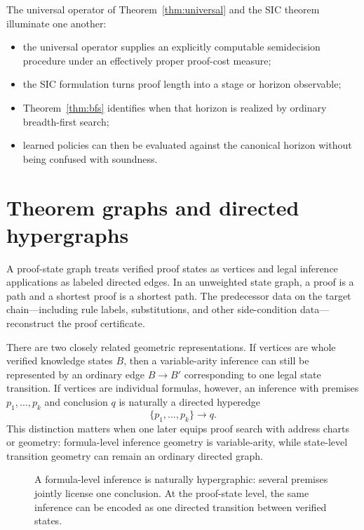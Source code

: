 \documentclass[11pt,oneside]{book}
\theoremstyle{definition}
\theoremstyle{remark}
\begin{document}
The universal operator of Theorem~\ref{thm:universal} and the SIC theorem illuminate one another:
\begin{itemize}
\item the universal operator supplies an explicitly computable semidecision procedure under an effectively proper proof-cost measure;
\item the SIC formulation turns proof length into a stage or horizon observable;
\item Theorem~\ref{thm:bfs} identifies when that horizon is realized by ordinary breadth-first search;
\item learned policies can then be evaluated against the canonical horizon without being confused with soundness.
\end{itemize}

\section{Theorem graphs and directed hypergraphs}
A proof-state graph treats verified proof states as vertices and legal inference applications as labeled directed edges. In an unweighted state graph, a proof is a path and a shortest proof is a shortest path. The predecessor data on the target chain---including rule labels, substitutions, and other side-condition data---reconstruct the proof certificate.

There are two closely related geometric representations. If vertices are whole verified knowledge states $B$, then a variable-arity inference can still be represented by an ordinary edge $B\to B'$ corresponding to one legal state transition. If vertices are individual formulas, however, an inference with premises $p_1,\ldots,p_k$ and conclusion $q$ is naturally a directed hyperedge
\[
\{p_1,\ldots,p_k\}\longrightarrow q.
\]
This distinction matters when one later equips proof search with address charts or geometry: formula-level inference geometry is variable-arity, while state-level transition geometry can remain an ordinary directed graph.

\begin{figure}[ht]
\centering
{}
\caption{A formula-level inference is naturally hypergraphic: several premises jointly license one conclusion. At the proof-state level, the same inference can be encoded as one directed transition between verified states.}
\label{fig:proofgraph}
\end{figure}
\end{document}
